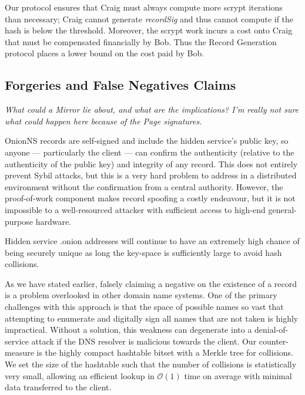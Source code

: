
Our protocol ensures that Craig must always compute more scrypt iterations than necessary; Craig cannot generate \emph{recordSig} and thus cannot compute if the hash is below the threshold. Moreover, the scrypt work incurs a cost onto Craig that must be compensated financially by Bob. Thus the Record Generation protocol places a lower bound on the cost paid by Bob.

\subsection{Forgeries and False Negatives Claims}

\emph{What could a Mirror lie about, and what are the implications? I'm really not sure what could happen here because of the Page signatures.}

OnionNS records are self-signed and include the hidden service's public key, so anyone --- particularly the client --- can confirm the authenticity (relative to the authenticity of the public key) and integrity of any record. This does not entirely prevent Sybil attacks, but this is a very hard problem to address in a distributed environment without the confirmation from a central authority. However, the proof-of-work component makes record spoofing a costly endeavour, but it is not impossible to a well-resourced attacker with sufficient access to high-end general-purpose hardware.

Hidden service .onion addresses will continue to have an extremely high chance of being securely unique as long the key-space is sufficiently large to avoid hash collisions.

As we have stated earlier, falsely claiming a negative on the existence of a record is a problem overlooked in other domain name systems. One of the primary challenges with this approach is that the space of possible names so vast that attempting to enumerate and digitally sign all names that are not taken is highly impractical. Without a solution, this weakness can degenerate into a denial-of-service attack if the DNS resolver is malicious towards the client. Our counter-measure is the highly compact hashtable bitset with a Merkle tree for collisions. We set the size of the hashtable such that the number of collisions is statistically very small, allowing an efficient lookup in $ \mathcal{O}(1) $ time on average with minimal data transferred to the client.

